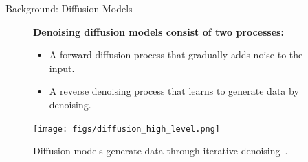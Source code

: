 

\begin{refsection}
\begin{frame}{Background: Diffusion Models}

  \begin{figure}
    \begin{minipage}{0.95\linewidth}
      \footnotesize
      \textbf{Denoising diffusion models consist of two processes:}
      \begin{itemize}
        \item A forward diffusion process that gradually adds noise to the input.
        \item A reverse denoising process that learns to generate data by denoising.
      \end{itemize}
    \end{minipage}
    \vspace{2em}

    \centering
    \texttt{[image: figs/diffusion\_high\_level.png]}

    \caption[]{\scriptsize Diffusion models generate data through iterative denoising~\parencite{sohl2015deep,ho2020denoising}.}
  \end{figure}

  \bottomleftrefs
\end{frame}
\end{refsection}

